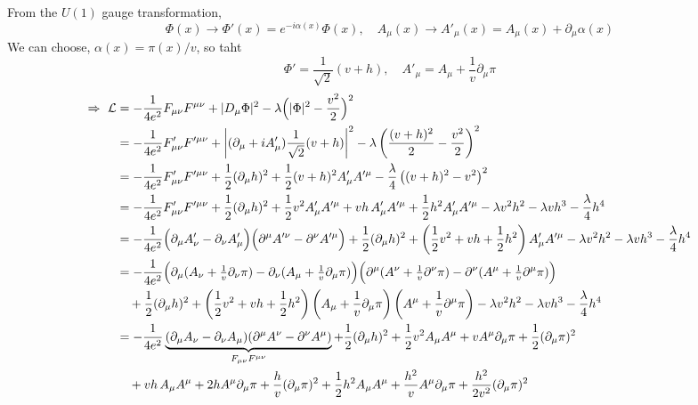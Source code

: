 \begin{solution}[23.2]
	From the $U(1)$ gauge transformation,
	\[
			\Phi(x)\to \Phi'(x)=e^{-i\alpha(x)}\Phi(x),\quad 
	A_\mu(x)\to A'_\mu(x)=A_\mu(x)+\partial_\mu\alpha(x)
	\]
	We can choose, $\alpha(x)=\pi(x)/v$, so taht
	\[
		\Phi'=\frac{1}{\sqrt2}(v+h),\quad 
	A'_\mu=A_\mu+\frac{1}{v}\partial_\mu\pi
	\]
	\[
	\begin{aligned}
		\Rightarrow\ 
		\mathcal{L}
		&=-\frac1{4e^2}F_{\mu\nu}F^{\mu\nu}+|D_\mu\Phi|^2-\lambda\Big(|\Phi|^2-\frac{v^2}2\Big)^2 \\
		&
		=-\frac1{4e^2}F'_{\mu\nu}F'^{\mu\nu}
		+\left|(\partial_\mu+iA'_\mu)\frac{1}{\sqrt2}(v+h)\right|^2
		-\lambda\left(\frac{(v+h)^2}{2}-\frac{v^2}{2}\right)^2 \\
		&=
		-\frac1{4e^2}F'_{\mu\nu}F'^{\mu\nu}
		+\frac12(\partial_\mu h)^2+\frac12(v+h)^2A'_\mu A'^{\mu}
		-\frac{\lambda}{4}\left((v+h)^2-v^2\right)^2 \\
		&=
		-\frac1{4e^2}F'_{\mu\nu}F'^{\mu\nu}
		+\frac12(\partial_\mu h)^2
		+\frac12v^2A'_\mu A'^{\mu}
		+vh\,A'_\mu A'^{\mu}
		+\frac12h^2A'_\mu A'^{\mu}
		-\lambda v^2h^2-\lambda vh^3-\frac{\lambda}{4}h^4\\
		&= -\frac{1}{4e^{2}}\Bigl(\partial_\mu A'_\nu-\partial_\nu A'_\mu\Bigr)\Bigl(\partial^\mu A'^\nu-\partial^\nu A'^\mu\Bigr)
		+\frac{1}{2}(\partial_{\mu}h)^{2}
		+\left(\frac{1}{2}v^{2}+vh+\frac{1}{2}h^{2}\right)A_{\mu}^{\prime}A^{\prime\mu}
		-\lambda v^{2}h^{2}-\lambda vh^{3}-\frac{\lambda}{4}h^{4} \\
		&= -\frac{1}{4e^{2}}\Bigl(\partial_\mu(A_\nu+\tfrac{1}{v}\partial_\nu\pi)-\partial_\nu(A_\mu+\tfrac{1}{v}\partial_\mu\pi)\Bigr)
		\Bigl(\partial^\mu(A^\nu+\tfrac{1}{v}\partial^\nu\pi)-\partial^\nu(A^\mu+\tfrac{1}{v}\partial^\mu\pi)\Bigr) \\
		&\quad +\frac{1}{2}(\partial_{\mu}h)^{2}
		+\left(\frac{1}{2}v^{2}+vh+\frac{1}{2}h^{2}\right)\left(A_\mu+\frac{1}{v}\partial_\mu\pi\right)\left(A^\mu+\frac{1}{v}\partial^\mu\pi\right)
		-\lambda v^{2}h^{2}-\lambda vh^{3}-\frac{\lambda}{4}h^{4} \\
		&= -\frac{1}{4e^{2}}\underbrace{(\partial_\mu A_\nu-\partial_\nu A_\mu)(\partial^\mu A^\nu-\partial^\nu A^\mu)}_{F_{\mu\nu}F^{\mu\nu}}
		+\frac{1}{2}(\partial_{\mu}h)^{2}
		+\frac{1}{2}v^{2}A_\mu A^\mu
		+vA^\mu\partial_\mu\pi
		+\frac{1}{2}(\partial_\mu\pi)^2 \\
		&\quad +vh\,A_\mu A^\mu
		+2hA^\mu\partial_\mu\pi
		+\frac{h}{v}(\partial_\mu\pi)^2
		+\frac{1}{2}h^{2}A_\mu A^\mu
		+\frac{h^{2}}{v}A^\mu\partial_\mu\pi
		+\frac{h^{2}}{2v^{2}}(\partial_\mu\pi)^2 \\

\end{aligned}\]
\end{solution}
